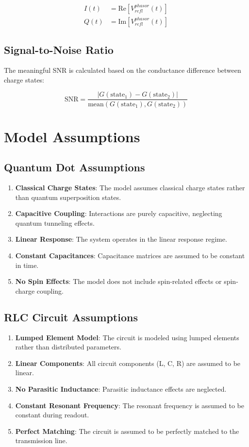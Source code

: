 \documentclass[11pt,a4paper]{article}
\begin{document}
\begin{align}
I(t) &= \text{Re}[V_{refl}^{phasor}(t)] \\
Q(t) &= \text{Im}[V_{refl}^{phasor}(t)]
\end{align}

\subsection{Signal-to-Noise Ratio}

The meaningful SNR is calculated based on the conductance difference between charge states:

\begin{equation}
\text{SNR} = \frac{|G(\text{state}_1) - G(\text{state}_2)|}{\text{mean}(G(\text{state}_1), G(\text{state}_2))}
\end{equation}

\section{Model Assumptions}

\subsection{Quantum Dot Assumptions}

\begin{enumerate}
\item \textbf{Classical Charge States}: The model assumes classical charge states rather than quantum superposition states.
\item \textbf{Capacitive Coupling}: Interactions are purely capacitive, neglecting quantum tunneling effects.
\item \textbf{Linear Response}: The system operates in the linear response regime.
\item \textbf{Constant Capacitances}: Capacitance matrices are assumed to be constant in time.
\item \textbf{No Spin Effects}: The model does not include spin-related effects or spin-charge coupling.
\end{enumerate}

\subsection{RLC Circuit Assumptions}

\begin{enumerate}
\item \textbf{Lumped Element Model}: The circuit is modeled using lumped elements rather than distributed parameters.
\item \textbf{Linear Components}: All circuit components (L, C, R) are assumed to be linear.
\item \textbf{No Parasitic Inductance}: Parasitic inductance effects are neglected.
\item \textbf{Constant Resonant Frequency}: The resonant frequency is assumed to be constant during readout.
\item \textbf{Perfect Matching}: The circuit is assumed to be perfectly matched to the transmission line.
\end{enumerate}
\end{document}
